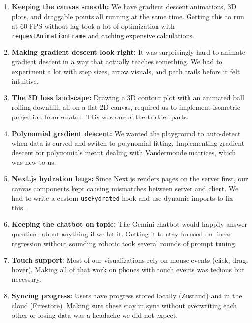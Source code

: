 \documentclass[12pt, a4paper]{article}
\begin{document}
\begin{enumerate}
    \item \textbf{Keeping the canvas smooth:} We have gradient descent animations, 3D plots, and draggable points all running at the same time. Getting this to run at 60 FPS without lag took a lot of optimization with \texttt{requestAnimationFrame} and caching expensive calculations.
    
    \item \textbf{Making gradient descent look right:} It was surprisingly hard to animate gradient descent in a way that actually teaches something. We had to experiment a lot with step sizes, arrow visuals, and path trails before it felt intuitive.
    
    \item \textbf{The 3D loss landscape:} Drawing a 3D contour plot with an animated ball rolling downhill, all on a flat 2D canvas, required us to implement isometric projection from scratch. This was one of the trickier parts.
    
    \item \textbf{Polynomial gradient descent:} We wanted the playground to auto-detect when data is curved and switch to polynomial fitting. Implementing gradient descent for polynomials meant dealing with Vandermonde matrices, which was new to us.
    
    \item \textbf{Next.js hydration bugs:} Since Next.js renders pages on the server first, our canvas components kept causing mismatches between server and client. We had to write a custom \texttt{useHydrated} hook and use dynamic imports to fix this.
    
    \item \textbf{Keeping the chatbot on topic:} The Gemini chatbot would happily answer questions about anything if we let it. Getting it to stay focused on linear regression without sounding robotic took several rounds of prompt tuning.
    
    \item \textbf{Touch support:} Most of our visualizations rely on mouse events (click, drag, hover). Making all of that work on phones with touch events was tedious but necessary.
    
    \item \textbf{Syncing progress:} Users have progress stored locally (Zustand) and in the cloud (Firestore). Making sure these stay in sync without overwriting each other or losing data was a headache we did not expect.
    

\end{enumerate}
\end{document}
